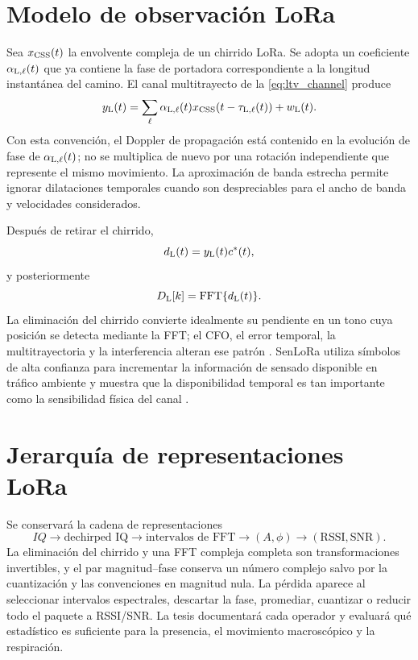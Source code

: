 \section{Modelo de observación LoRa}

Sea $x_{\rm CSS}(t)$ la envolvente compleja de un chirrido LoRa. Se adopta un
coeficiente $\alpha_{{\rm L},\ell}(t)$ que ya contiene la fase de portadora
correspondiente a la longitud instantánea del camino. El canal multitrayecto de la \cref{eq:ltv_channel} produce
\begin{equation}
y_{\rm L}(t)=\sum_{\ell}\alpha_{{\rm L},\ell}(t)
 x_{\rm CSS}(t-\tau_{{\rm L},\ell}(t))+w_{\rm L}(t).
\label{eq:lora_channel}
\end{equation}
Con esta convención, el Doppler de propagación está contenido en la evolución
de fase de $\alpha_{{\rm L},\ell}(t)$; no se multiplica de nuevo por una
rotación independiente que represente el mismo movimiento. La aproximación
de banda estrecha permite ignorar dilataciones temporales cuando son
despreciables para el ancho de banda y velocidades considerados.

Después de retirar el chirrido,
\begin{equation}
d_{\rm L}(t)=y_{\rm L}(t)c^*(t),
\end{equation}
y posteriormente
\begin{equation}
D_{\rm L}[k]=\operatorname{FFT}\{d_{\rm L}(t)\}.
\end{equation}
La eliminación del chirrido convierte idealmente su pendiente en un tono cuya posición se detecta mediante la FFT; el CFO, el error temporal, la multitrayectoria y la interferencia alteran ese patrón \citep{Ghanaatian2019LoRaRx,Maleki2023CSS}. SenLoRa utiliza símbolos de alta confianza para incrementar la información de sensado disponible en tráfico ambiente y muestra que la disponibilidad temporal es tan importante como la sensibilidad física del canal \citep{SenLoRa2025}.

\section{Jerarquía de representaciones LoRa}

Se conservará la cadena de representaciones
\begin{equation}
IQ\rightarrow \text{dechirped IQ}\rightarrow
\text{intervalos de FFT}\rightarrow
(A,\phi)\rightarrow
(\mathrm{RSSI},\mathrm{SNR}).
\end{equation}
La eliminación del chirrido y una FFT compleja completa son transformaciones invertibles, y el par magnitud--fase conserva un número complejo salvo por la cuantización y las convenciones en magnitud nula. La pérdida aparece al seleccionar intervalos espectrales, descartar la fase, promediar, cuantizar o reducir todo el paquete a RSSI/SNR. La tesis documentará cada operador y evaluará qué estadístico es suficiente para la presencia, el movimiento macroscópico y la respiración.

